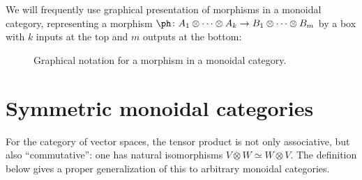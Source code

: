 \begin{convention}\label{c:graphical-monoidal}
We will frequently use graphical presentation of morphisms
in a monoidal category, representing a morphism
$\ph \colon A_1\otimes \dots \otimes A_k\to B_1\otimes\dots \otimes B_m$
by a box with $k$ inputs at the top and $m$ outputs at the bottom:
\begin{figure}[h]
  \centering
  \caption{Graphical notation for a morphism in a monoidal category.}
  \label{f:graphical-morphism}
\end{figure}
\end{convention}







\section{Symmetric monoidal categories}\label{s:symmetric-monoidal}
For the category of vector spaces, the tensor product is not only associative,
but also ``commutative'': one has natural isomorphisms $V\otimes W \simeq
W\otimes V$. The definition below gives a proper generalization of this to
arbitrary monoidal categories.

